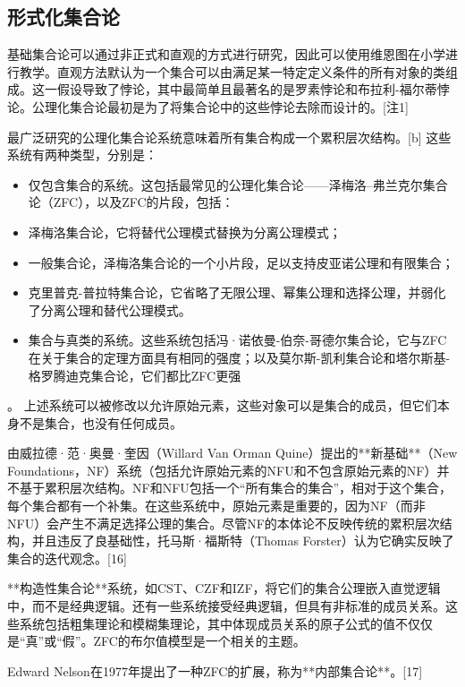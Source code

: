 \subsection{形式化集合论} 
基础集合论可以通过非正式和直观的方式进行研究，因此可以使用维恩图在小学进行教学。直观方法默认为一个集合可以由满足某一特定定义条件的所有对象的类组成。这一假设导致了悖论，其中最简单且最著名的是罗素悖论和布拉利-福尔蒂悖论。公理化集合论最初是为了将集合论中的这些悖论去除而设计的。[注1]

最广泛研究的公理化集合论系统意味着所有集合构成一个累积层次结构。[b] 这些系统有两种类型，分别是：
\begin{itemize}
\item 仅包含集合的系统。这包括最常见的公理化集合论——泽梅洛–弗兰克尔集合论（ZFC），以及ZFC的片段，包括：
\item 泽梅洛集合论，它将替代公理模式替换为分离公理模式；
\item 一般集合论，泽梅洛集合论的一个小片段，足以支持皮亚诺公理和有限集合；
\item 克里普克-普拉特集合论，它省略了无限公理、幂集公理和选择公理，并弱化了分离公理和替代公理模式。
\item 集合与真类的系统。这些系统包括冯·诺依曼-伯奈-哥德尔集合论，它与ZFC在关于集合的定理方面具有相同的强度；以及莫尔斯-凯利集合论和塔尔斯基-格罗腾迪克集合论，它们都比ZFC更强
\end{itemize}。
上述系统可以被修改以允许原始元素，这些对象可以是集合的成员，但它们本身不是集合，也没有任何成员。

由威拉德·范·奥曼·奎因（Willard Van Orman Quine）提出的**新基础**（New Foundations，NF）系统（包括允许原始元素的NFU和不包含原始元素的NF）并不基于累积层次结构。NF和NFU包括一个“所有集合的集合”，相对于这个集合，每个集合都有一个补集。在这些系统中，原始元素是重要的，因为NF（而非NFU）会产生不满足选择公理的集合。尽管NF的本体论不反映传统的累积层次结构，并且违反了良基础性，托马斯·福斯特（Thomas Forster）认为它确实反映了集合的迭代观念。[16]

**构造性集合论**系统，如CST、CZF和IZF，将它们的集合公理嵌入直觉逻辑中，而不是经典逻辑。还有一些系统接受经典逻辑，但具有非标准的成员关系。这些系统包括粗集理论和模糊集理论，其中体现成员关系的原子公式的值不仅仅是“真”或“假”。ZFC的布尔值模型是一个相关的主题。

Edward Nelson在1977年提出了一种ZFC的扩展，称为**内部集合论**。[17]